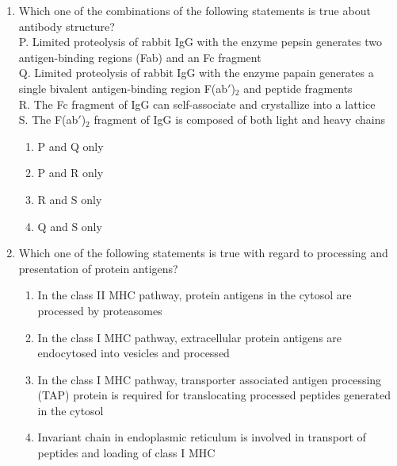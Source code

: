 \documentclass[journal,12pt,onecolumn]{IEEEtran}
\theoremstyle{remark}
\begin{document}
\begin{enumerate}
    \item Which one of the combinations of the following statements is true about antibody structure?\\
    P. Limited proteolysis of rabbit IgG with the enzyme pepsin generates two antigen-binding regions (Fab) and an Fc fragment\\
    Q. Limited proteolysis of rabbit IgG with the enzyme papain generates a single bivalent antigen-binding region F(ab$'$)$_2$ and peptide fragments\\
    R. The Fc fragment of IgG can self-associate and crystallize into a lattice\\
    S. The F(ab$'$)$_2$ fragment of IgG is composed of both light and heavy chains
    \begin{multicols}{2}
    \begin{enumerate}
        \item P and Q only
        \item P and R only
        \item R and S only
        \item Q and S only
    \end{enumerate}
    \end{multicols}

    \item Which one of the following statements is true with regard to processing and presentation of protein antigens?
   
    \begin{enumerate}
        \item In the class II MHC pathway, protein antigens in the cytosol are processed by proteasomes
        \item In the class I MHC pathway, extracellular protein antigens are endocytosed into vesicles and processed
        \item In the class I MHC pathway, transporter associated antigen processing (TAP) protein is required for translocating processed peptides generated in the cytosol
        \item Invariant chain in endoplasmic reticulum is involved in transport of peptides and loading of class I MHC
    \end{enumerate}
   

\end{enumerate}
\end{document}
